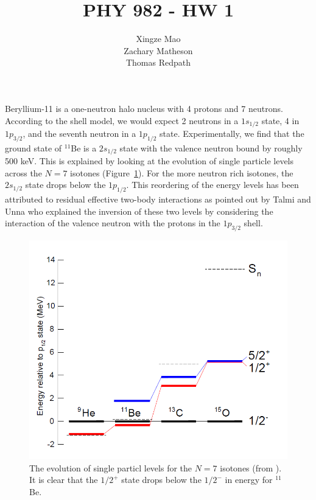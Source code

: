 \documentclass[]{scrartcl}
\title{PHY 982 - HW 1}
\author{Xingze Mao \\ Zachary Matheson \\ Thomas Redpath}
\date{}
\begin{document}
\maketitle

Beryllium-11 is a one-neutron halo nucleus with 4 protons and 7 neutrons. According to the shell model, we would expect 2 neutrons in a $1s_{1/2}$ state, 4 in $1p_{3/2}$, and the seventh neutron in a $1p_{1/2}$ state. Experimentally, we find that the ground state of $^{11}$Be is a $2s_{1/2}$ state with the valence neutron bound by roughly 500 keV. This is explained by looking at the evolution of single particle levels across the $N=7$ isotones (Figure~\ref{fig:n7isotones}). For the more neutron rich isotones, the  $2s_{1/2}$ state drops below the $1p_{1/2}$. This reordering of the energy levels has been attributed to residual effective two-body interactions as pointed out by Talmi and Unna \citep{TalmiUnna1960} who explained the inversion of these two levels by considering the interaction of the valence neutron with the protons in the $1p_{3/2}$ shell. 

\begin{figure}
\centering
	\includegraphics[width=\textwidth]{figures/n7isotones.png}
	\caption{The evolution of single particl levels for the $N=7$ isotones (from \citep{Schmitt2011}). It is clear that the $1/2 ^+$ state drops below the $1/2 ^-$ in energy for $^{11}$Be.}
	\label{fig:n7isotones}
\end{figure}
\end{document}
